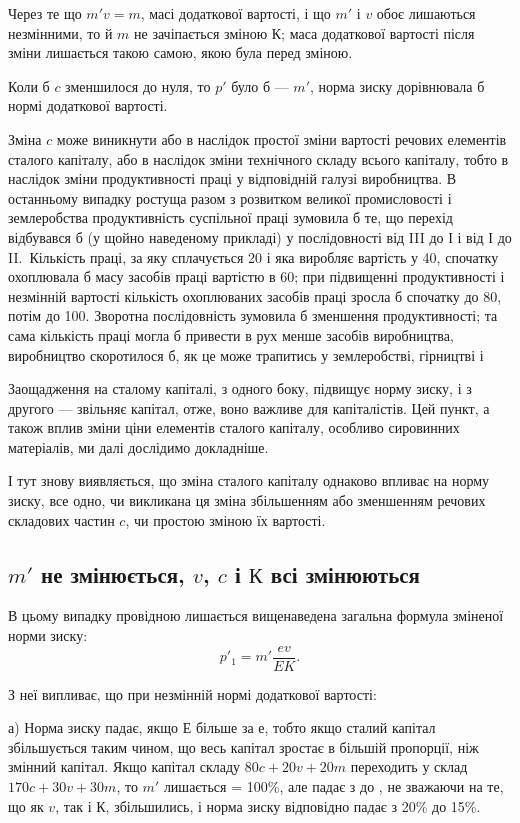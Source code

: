 
Через те що  $m'v = m$, масі додаткової вартості, і що $m'$ і $v$
обоє лишаються незмінними, то й $m$ не зачіпається зміною $К$;
маса додаткової вартості після зміни лишається такою самою,
якою була перед зміною.

Коли б $c$ зменшилося до нуля, то $p'$ було б — $m'$, норма зиску
дорівнювала б нормі додаткової вартості.

Зміна $c$ може виникнути або в наслідок простої зміни вартості
речових елементів сталого капіталу, або в наслідок зміни технічного
складу всього капіталу, тобто в наслідок зміни продуктивності
праці у відповідній галузі виробництва. В останньому
випадку ростуща разом з розвитком великої промисловості і
землеробства продуктивність суспільної праці зумовила б те, що
перехід відбувався б (у щойно наведеному прикладі) у послідовності
від III до І і від І до II.~Кількість праці, за яку сплачується
20 і яка виробляє вартість у 40, спочатку охоплювала б масу засобів
праці вартістю в 60; при підвищенні продуктивності і незмінній
вартості кількість охоплюваних засобів праці зросла б спочатку
до 80, потім до 100. Зворотна послідовність зумовила б
зменшення продуктивності; та сама кількість праці могла б привести
в рух менше засобів виробництва, виробництво скоротилося
б, як це може трапитись у землеробстві, гірництві і~

Заощадження на сталому капіталі, з одного боку, підвищує
норму зиску, і з другого — звільняє капітал, отже, воно важливе
для капіталістів. Цей пункт, а також вплив зміни ціни елементів
сталого капіталу, особливо сировинних матеріалів, ми далі дослідимо
докладніше.

І тут знову виявляється, що зміна сталого капіталу однаково
впливає на норму зиску, все одно, чи викликана ця зміна збільшенням
або зменшенням речових складових частин $c$, чи простою
зміною їх вартості.

\subsection{$m'$ не змінюється, $v$, $c$ і $К$ всі змінюються}

В цьому випадку провідною лишається вищенаведена загальна
формула зміненої норми зиску:
\[
p'_1 = m'\frac{ev}{EK}.
\]

З неї випливає, що при незмінній нормі додаткової вартості:

а) Норма зиску падає, якщо $Е$ більше за $е$, тобто якщо сталий
капітал збільшується таким чином, що весь капітал зростає
в більшій пропорції, ніж змінний капітал. Якщо капітал складу
$80 c + 20 v + 20 m$ переходить у склад $170 c + 30 v + 30 m$, то $m'$
лишається = 100\%, але падає з  до , не
зважаючи на те,
що як $v$, так і $К$, збільшились, і норма зиску відповідно падає з
20\% до 15\%.
